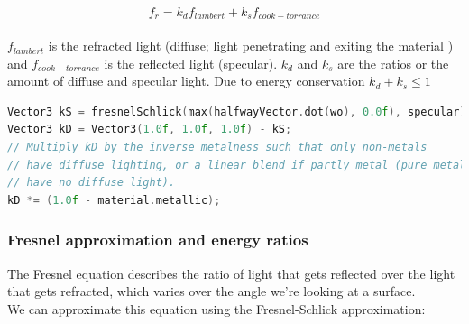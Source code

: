 \documentclass{article}
\begin{document}
$$f_{r} = k_{d}f_{lambert} + k_{s}f_{cook-torrance}$$
\\
$f_{lambert}$ is the refracted light (diffuse; light penetrating and exiting the material ) and $f_{cook-torrance}$ is the reflected light (specular).\newline
$k_{d}$ and $k_{s}$ are the ratios or the amount of diffuse and specular light. Due to energy conservation $k_{d} + k_{s} \leq 1$
\\
\begin{lstlisting}[language=C++]
Vector3 kS = fresnelSchlick(max(halfwayVector.dot(wo), 0.0f), specular);
Vector3 kD = Vector3(1.0f, 1.0f, 1.0f) - kS;
// Multiply kD by the inverse metalness such that only non-metals
// have diffuse lighting, or a linear blend if partly metal (pure metals
// have no diffuse light).
kD *= (1.0f - material.metallic);
\end{lstlisting}

\subsubsection{Fresnel approximation and energy ratios}
The Fresnel equation describes the ratio of light that gets reflected over the light that gets refracted, which varies over the angle we're looking at a surface.
\\
We can approximate this equation using the Fresnel-Schlick approximation:
\end{document}
